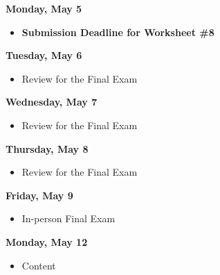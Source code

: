 \documentclass[11pt]{article}
\begin{document}
\textbf{Monday, May 5}

\begin{itemize}
\item \textbf{Submission Deadline for Worksheet \#8}
\end{itemize}

\textbf{Tuesday, May 6}

\begin{itemize}
\item Review for the Final Exam
\end{itemize}

\textbf{Wednesday, May 7}

\begin{itemize}
\item Review for the Final Exam
\end{itemize}

\textbf{Thursday, May 8}

\begin{itemize}
\item Review for the Final Exam
\end{itemize}

\textbf{Friday, May 9}

\begin{itemize}
\item In-person Final Exam
\end{itemize}

\textbf{Monday, May 12}

\begin{itemize}
\item Content
\end{itemize}
\end{document}
